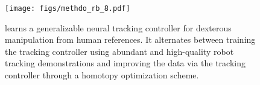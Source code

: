 \begin{figure}[h]
  \centering
  \vspace{-10pt}
  \texttt{[image: figs/methdo\_rb\_8.pdf]}
  \vspace{-20pt}
  \caption{\footnotesize
  \textcolor{myblue}{\href{https://projectwebsite7.github.io/gene-dex-manip/}{\modelname} }
  learns a generalizable neural tracking controller for dexterous manipulation from human references. It alternates between training the tracking controller using abundant and high-quality robot tracking demonstrations and improving the data
  via the tracking controller through a homotopy optimization scheme.
}
\end{figure}
